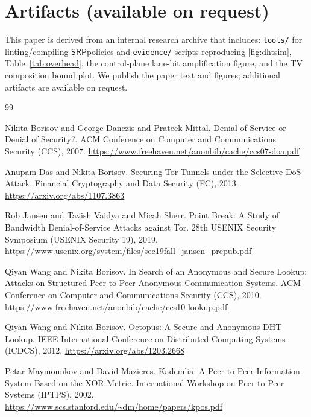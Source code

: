 \documentclass[11pt]{article}
\newcommand{\SRP}{\ensuremath{\mathsf{SRP}}}
\begin{document}
\section*{Artifacts (available on request)}
This paper is derived from an internal research archive that includes:
\texttt{tools/} for linting/compiling \SRP policies and \texttt{evidence/} scripts reproducing \cref{fig:dhtsim}, Table~\ref{tab:overhead}, the control-plane lane-bit amplification figure, and the TV composition bound plot.
We publish the paper text and figures; additional artifacts are available on request.

\begin{thebibliography}{99}\small

Nikita Borisov and George Danezis and Prateek Mittal.
\newblock Denial of Service or Denial of Security?.
\newblock ACM Conference on Computer and Communications Security (CCS), 2007.
\newblock \url{https://www.freehaven.net/anonbib/cache/ccs07-doa.pdf}

Anupam Das and Nikita Borisov.
\newblock Securing {Tor} Tunnels under the Selective-{DoS} Attack.
\newblock Financial Cryptography and Data Security (FC), 2013.
\newblock \url{https://arxiv.org/abs/1107.3863}

Rob Jansen and Tavish Vaidya and Micah Sherr.
\newblock Point Break: A Study of Bandwidth Denial-of-Service Attacks against {Tor}.
\newblock 28th {USENIX} Security Symposium ({USENIX} Security 19), 2019.
\newblock \url{https://www.usenix.org/system/files/sec19fall_jansen_prepub.pdf}

Qiyan Wang and Nikita Borisov.
\newblock In Search of an Anonymous and Secure Lookup: Attacks on Structured Peer-to-Peer Anonymous Communication Systems.
\newblock ACM Conference on Computer and Communications Security (CCS), 2010.
\newblock \url{https://www.freehaven.net/anonbib/cache/ccs10-lookup.pdf}

Qiyan Wang and Nikita Borisov.
\newblock Octopus: A Secure and Anonymous {DHT} Lookup.
\newblock IEEE International Conference on Distributed Computing Systems (ICDCS), 2012.
\newblock \url{https://arxiv.org/abs/1203.2668}

Petar Maymounkov and David Mazieres.
\newblock Kademlia: A Peer-to-Peer Information System Based on the {XOR} Metric.
\newblock International Workshop on Peer-to-Peer Systems (IPTPS), 2002.
\newblock \url{https://www.scs.stanford.edu/~dm/home/papers/kpos.pdf}


\end{thebibliography}
\end{document}
